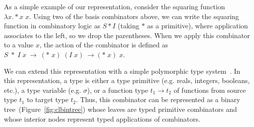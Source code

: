 \documentclass{article}
\begin{document}
As a simple example of our representation, consider the squaring
function $\lambda x. * x\; x $. Using two of the basis combinators
above, we can write the squaring function in combinatory logic as $S *
I$ (taking $*$ as a primitive), where application associates to the
left, so we drop the parentheses. When we apply this combinator to a
value $x$, the action of the combinator is defined as $S \;*\; I\;
x~\rightarrow~(*\; x)\; (I\; x)~\rightarrow(*\; x)\; x$.

We can extend this representation with a simple polymorphic type
system~\cite{Pierce_2002}. In this representation, a type is either a
type primitive (e.g. reals, integers, booleans, etc.), a type variable
(e.g. $\sigma$), or a function type $ t_1 \rightarrow t_2$ of
functions from source type $t_1$ to target type $t_2$. Thus, this
combinator can be represented as a binary
tree~(Figure~\ref{fig:clbintree}) whose leaves are typed primitive
combinators and whose interior nodes represent typed applications of
combinators.
\end{document}
